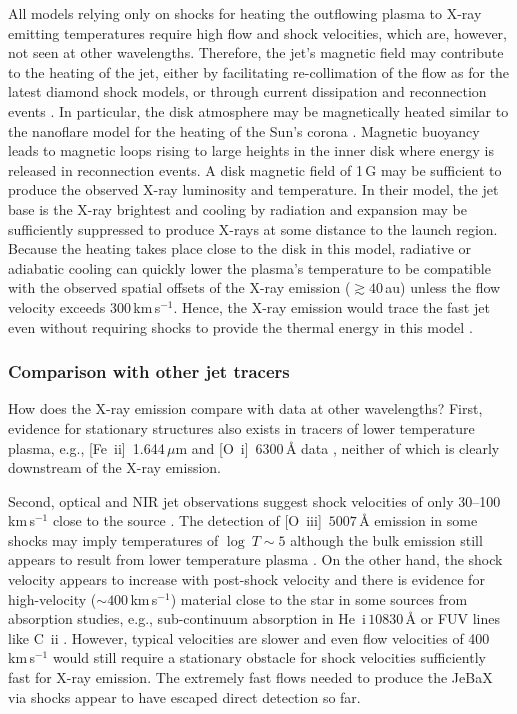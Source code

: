 \documentclass[graybox, nosecnum]{svmult}
\begin{document}
All models relying only on shocks for heating the outflowing plasma to X-ray emitting temperatures require high flow and shock velocities, which are, however, not seen at other wavelengths. Therefore, the jet's magnetic field may contribute to the heating of the jet, either by facilitating re-collimation of the flow as for the latest diamond shock models, or through current dissipation and reconnection events \cite{Guedel_2007, Schneider_2013a}.
In particular, the disk atmosphere may be magnetically heated similar to the nanoflare model for the heating of the Sun's corona \cite{Takasao_2017}. Magnetic buoyancy leads to magnetic loops rising to large heights in the inner disk where energy is released in reconnection events. A disk magnetic field of 1\,G may be sufficient to produce the observed X-ray luminosity and temperature. In their model, the jet base is the X-ray brightest and cooling by radiation and expansion may be sufficiently suppressed to produce X-rays at some distance to the launch region. Because the heating takes place close to the disk in this model, radiative or adiabatic cooling can quickly lower the plasma's temperature to be compatible with the observed spatial offsets of the X-ray emission ($\gtrsim40$\,au) unless the flow velocity exceeds 300\,km\,s$^{-1}$. Hence, the X-ray emission would trace the fast jet even without requiring shocks to provide the thermal energy in this model \cite{Takasao_2017}. 

\subsubsection{Comparison with other jet tracers}
How does the X-ray emission compare with data at other wavelengths? First, 
evidence for stationary structures also exists in tracers of lower temperature plasma, e.g., [Fe~{\sc ii}]~1.644\,$\mu$m  \citep{White_2014} and [O~{\sc i}]~$6300\,$\AA{} data \citep[][]{Schneider_2013a}, neither of which is clearly downstream of the X-ray emission. 

Second, optical and NIR jet observations suggest shock velocities of only 30--100\,km\,s$^{-1}$ close to the source \citep[e.g., ][]{Lavalley_2000, Hartigan_2007}. The detection of [O~{\sc iii}]~$5007\,$\AA{} emission in some shocks may imply temperatures of $\log~T\sim5$ although the bulk emission still appears to result from lower temperature plasma \citep[e.g.,][]{Bacciotti_2011,Nisini_2016}. On the other hand, the shock velocity appears to increase with post-shock velocity and there is evidence for high-velocity ($\sim400\,$km\,s$^{-1}$) material close to the star in some sources from absorption studies, e.g., sub-continuum absorption in He~{\sc i}\,$10830\,$\AA{} \citep[e.g.][]{Edwards_2006} or FUV lines like C~{\sc ii} \citep{Xu_2021}. However, typical velocities are slower and even flow velocities of 400\,km\,s$^{-1}$ would still require a stationary obstacle for shock velocities sufficiently fast for X-ray emission. The extremely fast flows needed to produce the JeBaX via shocks appear to have escaped direct detection so far. 
\end{document}
